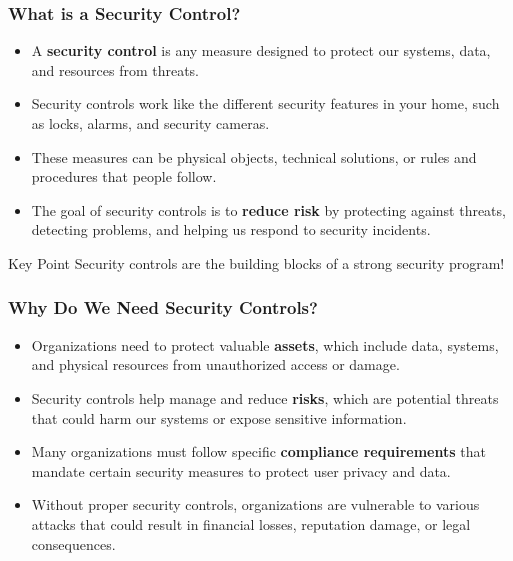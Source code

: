 \documentclass{beamer}
\begin{document}
\begin{frame}
    \frametitle{What is a Security Control?}
    
    \begin{itemize}
        \item A \textbf{security control} is any measure designed to protect our systems, data, and resources from threats.
        
        \item Security controls work like the different security features in your home, such as locks, alarms, and security cameras.
        
        \item These measures can be physical objects, technical solutions, or rules and procedures that people follow.
        
        \item The goal of security controls is to \textbf{reduce risk} by protecting against threats, detecting problems, and helping us respond to security incidents.
    \end{itemize}
    
    \begin{alertblock}{Key Point}
        Security controls are the building blocks of a strong security program!
    \end{alertblock}
\end{frame}

\begin{frame}
    \frametitle{Why Do We Need Security Controls?}
    
    \begin{itemize}
        \item Organizations need to protect valuable \textbf{assets}, which include data, systems, and physical resources from unauthorized access or damage.
        
        \item Security controls help manage and reduce \textbf{risks}, which are potential threats that could harm our systems or expose sensitive information.
        
        \item Many organizations must follow specific \textbf{compliance requirements} that mandate certain security measures to protect user privacy and data.
        
        \item Without proper security controls, organizations are vulnerable to various attacks that could result in financial losses, reputation damage, or legal consequences.
    \end{itemize}
\end{frame}
\end{document}
